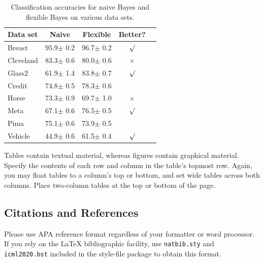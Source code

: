 \documentclass{article}
\begin{document}
\begin{table}[t]
  \caption{Classification accuracies for naive Bayes and flexible
  Bayes on various data sets.}
  \label{sample-table}
  \vskip 0.15in
  \begin{center}
    \begin{small}
      \begin{sc}
        \begin{tabular}{lcccr}
          \toprule
          Data set & Naive & Flexible & Better? \\
          \midrule
          Breast    & 95.9$\pm$ 0.2& 96.7$\pm$ 0.2& $\surd$ \\
          Cleveland & 83.3$\pm$ 0.6& 80.0$\pm$ 0.6& $\times$\\
          Glass2    & 61.9$\pm$ 1.4& 83.8$\pm$ 0.7& $\surd$ \\
          Credit    & 74.8$\pm$ 0.5& 78.3$\pm$ 0.6&         \\
          Horse     & 73.3$\pm$ 0.9& 69.7$\pm$ 1.0& $\times$\\
          Meta      & 67.1$\pm$ 0.6& 76.5$\pm$ 0.5& $\surd$ \\
          Pima      & 75.1$\pm$ 0.6& 73.9$\pm$ 0.5&         \\
          Vehicle   & 44.9$\pm$ 0.6& 61.5$\pm$ 0.4& $\surd$ \\
          \bottomrule
        \end{tabular}
      \end{sc}
    \end{small}
  \end{center}
  \vskip -0.1in
\end{table}

Tables contain textual material, whereas figures contain graphical material.
Specify the contents of each row and column in the table's topmost
row. Again, you may float tables to a column's top or bottom, and set
wide tables across both columns. Place two-column tables at the
top or bottom of the page.

\subsection{Citations and References}

Please use APA reference format regardless of your formatter
or word processor. If you rely on the \LaTeX\/ bibliographic
facility, use \texttt{natbib.sty} and \texttt{icml2020.bst}
included in the style-file package to obtain this format.
\end{document}
